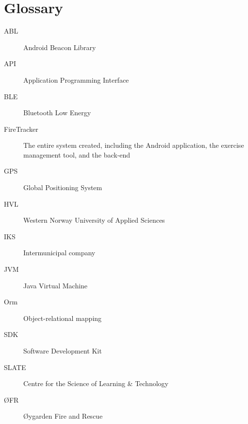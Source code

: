 \documentclass[../Main/thesis.tex]{subfiles}
\begin{document}
\chapter*{Glossary}
\begin{description}
\item[ABL] Android Beacon Library
\item[API] Application Programming Interface
\item[BLE] Bluetooth Low Energy
\item[FireTracker] The entire system created, including the Android application, the exercise management tool, and the back-end
\item[GPS] Global Positioning System
\item[HVL] Western Norway University of Applied Sciences
\item[IKS] Intermunicipal company
\item[JVM] Java Virtual Machine
\item[Orm] Object-relational mapping 
\item[SDK] Software Development Kit
\item[SLATE] Centre for the Science of Learning \& Technology
\item[ØFR] Øygarden Fire and Rescue
\end{description}

\blankpage
\end{document}
